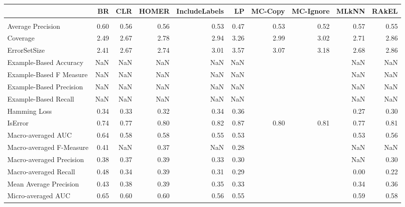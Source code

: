 \begin{tabular}{l|rrrrrrrrr}

  & BR & CLR & HOMER & IncludeLabels & LP & MC-Copy & MC-Ignore & MLkNN & RAkEL \\

\hline \\

Average Precision & 0.60 & 0.56 & 0.56 & 0.53 & 0.47 & 0.53 & 0.52 & 0.57 & 0.55 \\

Coverage & 2.49 & 2.67 & 2.78 & 2.94 & 3.26 & 2.99 & 3.02 & 2.71 & 2.86 \\

ErrorSetSize & 2.41 & 2.67 & 2.74 & 3.01 & 3.57 & 3.07 & 3.18 & 2.68 & 2.86 \\

Example-Based Accuracy & NaN & NaN & NaN & NaN & NaN &  &  & NaN & NaN \\

Example-Based F Measure & NaN & NaN & NaN & NaN & NaN &  &  & NaN & NaN \\

Example-Based Precision & NaN & NaN & NaN & NaN & NaN &  &  & NaN & NaN \\

Example-Based Recall & NaN & NaN & NaN & NaN & NaN &  &  & NaN & NaN \\

Hamming Loss & 0.34 & 0.33 & 0.32 & 0.34 & 0.36 &  &  & 0.27 & 0.30 \\

IsError & 0.74 & 0.77 & 0.80 & 0.82 & 0.87 & 0.80 & 0.81 & 0.77 & 0.81 \\

Macro-averaged AUC & 0.64 & 0.58 & 0.58 & 0.55 & 0.53 &  &  & 0.53 & 0.56 \\

Macro-averaged F-Measure & 0.41 & NaN & 0.37 & NaN & 0.28 &  &  & NaN & NaN \\

Macro-averaged Precision & 0.38 & 0.37 & 0.39 & 0.33 & 0.30 &  &  & NaN & 0.30 \\

Macro-averaged Recall & 0.48 & 0.34 & 0.39 & 0.31 & 0.29 &  &  & 0.00 & 0.22 \\

Mean Average Precision & 0.43 & 0.38 & 0.39 & 0.35 & 0.33 &  &  & 0.34 & 0.36 \\

Micro-averaged AUC & 0.65 & 0.60 & 0.60 & 0.56 & 0.55 &  &  & 0.59 & 0.58 \\


\end{tabular}
